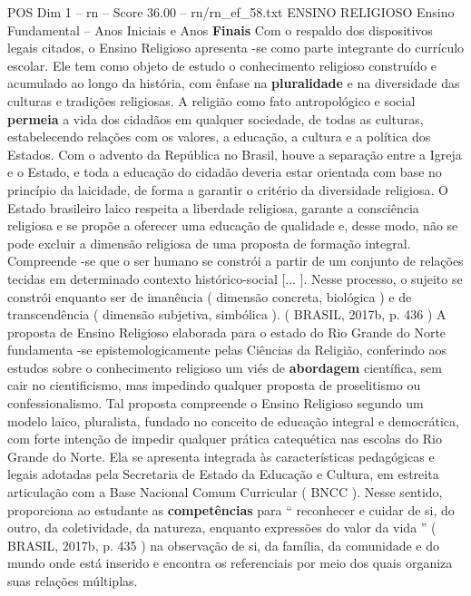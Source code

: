 \begin{textsample}{POS Dim 1 – rn – Score 36.00 – rn/rn\_ef\_58.txt}  \label{ex:f1_pos_270}
ENSINO RELIGIOSO Ensino Fundamental – Anos Iniciais e Anos \textbf{Finais} Com o respaldo dos dispositivos legais citados, o Ensino Religioso apresenta -se como parte integrante do currículo escolar.
Ele tem como objeto de estudo o conhecimento religioso construído e acumulado ao longo da história, com ênfase na \textbf{pluralidade} e na diversidade das culturas e tradições religiosas.
A religião como fato antropológico e social \textbf{permeia} a vida dos cidadãos em qualquer sociedade, de todas as culturas, estabelecendo relações com os valores, a educação, a cultura e a política dos Estados.
Com o advento da República no Brasil, houve a separação entre a Igreja e o Estado, e toda a educação do cidadão deveria estar orientada com base no princípio da laicidade, de forma a garantir o critério da diversidade religiosa.
O Estado brasileiro laico respeita a liberdade religiosa, garante a consciência religiosa e se propõe a oferecer uma educação de qualidade e, desse modo, não se pode excluir a dimensão religiosa de uma proposta de formação integral.
Compreende -se que o ser humano se constrói a partir de um conjunto de relações tecidas em determinado contexto histórico-social [... ].
Nesse processo, o sujeito se constrói enquanto ser de imanência ( dimensão concreta, biológica ) e de transcendência ( dimensão subjetiva, simbólica ). ( BRASIL, 2017b, p. 436 ) A proposta de Ensino Religioso elaborada para o estado do Rio Grande do Norte fundamenta -se epistemologicamente pelas Ciências da Religião, conferindo aos estudos sobre o conhecimento religioso um viés de \textbf{abordagem} científica, sem cair no cientificismo, mas impedindo qualquer proposta de proselitismo ou confessionalismo.
Tal proposta compreende o Ensino Religioso segundo um modelo laico, pluralista, fundado no conceito de educação integral e democrática, com forte intenção de impedir qualquer prática catequética nas escolas do Rio Grande do Norte.
Ela se apresenta integrada às características pedagógicas e legais adotadas pela Secretaria de Estado da Educação e Cultura, em estreita articulação com a Base Nacional Comum Curricular ( BNCC ).
Nesse sentido, proporciona ao estudante as \textbf{competências} para “ reconhecer e cuidar de si, do outro, da coletividade, da natureza, enquanto expressões do valor da vida ” ( BRASIL, 2017b, p. 435 ) na observação de si, da família, da comunidade e do mundo onde está inserido e encontra os referenciais por meio dos quais organiza suas relações múltiplas.

\end{textsample}
